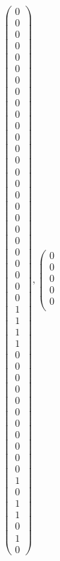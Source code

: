 \documentclass[8pt]{article}
\begin{document}
 \newline \begin{align*}
 \left(\begin{array}{r}
0 \\
0 \\
0 \\
0 \\
0 \\
0 \\
0 \\
0 \\
0 \\
0 \\
0 \\
0 \\
0 \\
0 \\
0 \\
0 \\
0 \\
0 \\
0 \\
0 \\
0 \\
0 \\
0 \\
0 \\
0 \\
0 \\
1 \\
1 \\
1 \\
1 \\
0 \\
0 \\
0 \\
0 \\
0 \\
0 \\
0 \\
0 \\
0 \\
0 \\
0 \\
1 \\
0 \\
1 \\
1 \\
0 \\
1 \\
0
\end{array}\right) ,
 \left(\begin{array}{r}
0 \\
0 \\
0 \\
0 \\
0 \\

\end{array}
\end{align*}
\end{document}
